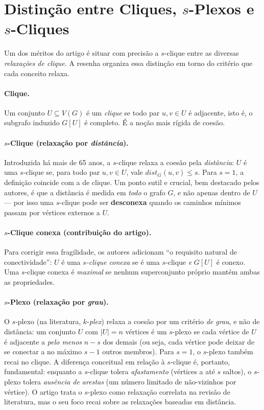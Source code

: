 \documentclass[12pt]{article}
\begin{document}
\section{Distinção entre Cliques, $s$-Plexos e $s$-Cliques}

Um dos méritos do artigo é situar com precisão a $s$-clique entre as diversas
\emph{relaxações de clique}. A resenha organiza essa distinção em torno do
critério que cada conceito relaxa.

\paragraph{Clique.} Um conjunto $U \subseteq V(G)$ é um \emph{clique} se todo par
$u, v \in U$ é adjacente, isto é, o subgrafo induzido $G[U]$ é completo. É a noção
mais rígida de coesão.

\paragraph{$s$-Clique (relaxação por \emph{distância}).} Introduzida há mais de
65 anos, a $s$-clique relaxa a coesão pela \emph{distância}: $U$ é uma
$s$-clique se, para todo par $u, v \in U$, vale $dist_G(u, v) \leq s$. Para
$s = 1$, a definição coincide com a de clique. Um ponto sutil e crucial, bem
destacado pelos autores, é que a distância é medida em \emph{todo} o grafo $G$,
e não apenas dentro de $U$ --- por isso uma $s$-clique pode ser
\textbf{desconexa} quando os caminhos mínimos passam por vértices externos a $U$.

\paragraph{$s$-Clique conexa (contribuição do artigo).} Para corrigir essa
fragilidade, os autores adicionam ``o requisito natural de conectividade'':
$U$ é uma \emph{$s$-clique conexa} se é uma $s$-clique \emph{e} $G[U]$ é conexo.
Uma $s$-clique conexa é \emph{maximal} se nenhum superconjunto próprio mantém
ambas as propriedades.

\paragraph{$s$-Plexo (relaxação por \emph{grau}).} O $s$-plexo (na literatura,
$k$-\emph{plex}) relaxa a coesão por um critério \emph{de grau}, e não de
distância: um conjunto $U$ com $|U| = n$ vértices é um $s$-plexo se cada vértice
de $U$ é adjacente a \emph{pelo menos} $n - s$ dos demais (ou seja, cada vértice
pode deixar de se conectar a no máximo $s - 1$ outros membros). Para $s = 1$, o
$s$-plexo também recai no clique. A diferença conceitual em relação à $s$-clique
é, portanto, fundamental: enquanto a $s$-clique tolera \emph{afastamento}
(vértices a até $s$ saltos), o $s$-plexo tolera \emph{ausência de arestas}
(um número limitado de não-vizinhos por vértice). O artigo trata o $s$-plexo
como relaxação correlata na revisão de literatura, mas o seu foco recai sobre as
relaxações baseadas em distância.
\end{document}
